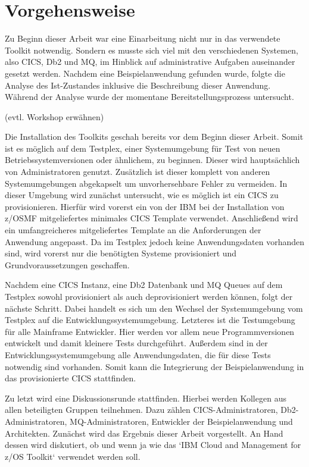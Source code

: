 \chapter{Vorgehensweise}\label{ch:vorgehensweise}
Zu Beginn dieser Arbeit war eine Einarbeitung nicht nur in das verwendete Toolkit notwendig.
Sondern es musste sich viel mit den verschiedenen Systemen, also CICS, Db2 und MQ, im Hinblick auf administrative Aufgaben auseinander gesetzt werden.
Nachdem eine Beispielanwendung gefunden wurde, folgte die Analyse des Ist-Zustandes inklusive die Beschreibung dieser Anwendung.
Während der Analyse wurde der momentane Bereitstellungsprozess untersucht.

(evtl. Workshop erwähnen)

Die Installation des Toolkits geschah bereits vor dem Beginn dieser Arbeit.
Somit ist es möglich auf dem Testplex, einer Systemumgebung für Test von neuen Betriebssystemversionen oder ähnlichem, zu beginnen.
Dieser wird hauptsächlich von Administratoren genutzt.
Zusätzlich ist dieser komplett von anderen Systemumgebungen abgekapselt um unvorhersehbare Fehler zu vermeiden.
In dieser Umgebung wird zunächst untersucht, wie es möglich ist ein CICS zu provisionieren.
Hierfür wird vorerst ein von der IBM bei der Installation von z/OSMF mitgeliefertes minimales CICS Template verwendet.
Anschließend wird ein umfangreicheres mitgeliefertes Template an die Anforderungen der Anwendung angepasst.
Da im Testplex jedoch keine Anwendungsdaten vorhanden sind, wird vorerst nur die benötigten Systeme provisioniert und Grundvoraussetzungen geschaffen.

Nachdem eine CICS Instanz, eine Db2 Datenbank und MQ Queues auf dem Testplex sowohl provisioniert als auch deprovisioniert werden können, folgt der nächste Schritt.
Dabei handelt es sich um den Wechsel der Systemumgebung vom Testplex auf die Entwicklungssystemumgebung.
Letzteres ist die Testumgebung für alle Mainframe Entwickler.
Hier werden vor allem neue Programmversionen entwickelt und damit kleinere Tests durchgeführt.
Außerdem sind in der Entwicklungssystemumgebung alle Anwendungsdaten, die für diese Tests notwendig sind vorhanden.
Somit kann die Integrierung der Beispielanwendung in das provisionierte CICS stattfinden.

Zu letzt wird eine Diskussionsrunde stattfinden.
Hierbei werden Kollegen aus allen beteiligten Gruppen teilnehmen.
Dazu zählen CICS-Administratoren, Db2-Administratoren, MQ-Administratoren, Entwickler der Beispielanwendung und Architekten.
Zunächst wird das Ergebnis dieser Arbeit vorgestellt.
An Hand dessen wird diskutiert, ob und wenn ja wie das `IBM Cloud and Management for z/OS Toolkit` verwendet werden soll.